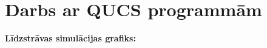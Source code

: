 \documentclass {report}
\begin{document}
\section{Darbs ar QUCS programmām}
\textbf{Līdzstrāvas simulācijas grafiks:}
\\
\end{document}
